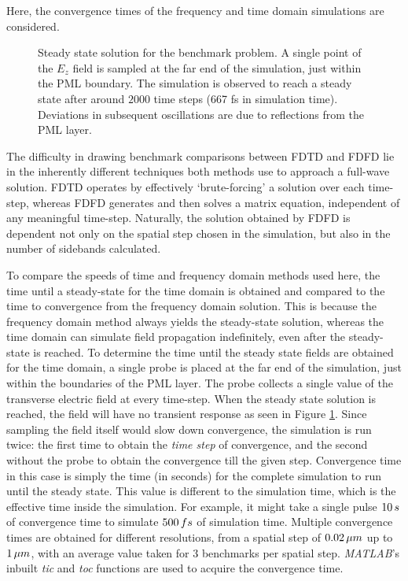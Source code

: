 Here, the convergence times of the frequency and time domain simulations are considered. 
\begin{figure}[t]
	\centering
	\setlength{\figH}{0.3\textwidth}
	\setlength{\figW}{0.7\textwidth}
	
	\caption[Steady state time of the $E_z$ field]{Steady state solution for the benchmark problem. A single point of the $E_z$ field is sampled at the far end of the simulation, just within the PML boundary. The simulation is observed to reach a steady state after around $2 000$ time steps (667 fs in simulation time). Deviations in subsequent oscillations are due to reflections from the PML layer.}
	\label{fig:steadystate}
\end{figure}
The difficulty in drawing benchmark comparisons between FDTD and FDFD lie in the inherently different techniques both methods use to approach a full-wave solution. FDTD operates by effectively `brute-forcing' a solution over each time-step, whereas FDFD generates and then solves a matrix equation, independent of any meaningful time-step. Naturally, the solution obtained by FDFD is dependent not only on the spatial step chosen in the simulation, but also in the number of sidebands calculated. 

To compare the speeds of time and frequency domain methods used here, the time until a steady-state for the time domain is obtained and compared to the time to convergence from the frequency domain solution. This is because the frequency domain method always yields the steady-state solution, whereas the time domain can simulate field propagation indefinitely, even after the steady-state is reached. To determine the time until the steady state fields are obtained for the time domain, a single probe is placed at the far end of the simulation, just within the boundaries of the PML layer. The probe collects a single value of the transverse electric field at every time-step. When the steady state solution is reached, the field will have no transient response as seen in Figure \ref{fig:steadystate}. Since sampling the field itself would slow down  convergence, the simulation is run twice: the first time to obtain the \textit{time step} of convergence, and the second without the probe to obtain the convergence till the given step. Convergence time in this case is simply the time (in seconds) for the complete simulation to run until the steady state. This value is different to the simulation time, which is the effective time inside the simulation. For example, it might take a single pulse $10 \mskip3mu s$ of convergence time to simulate $500\mskip3mu fs$ of simulation time. Multiple convergence times are obtained for different resolutions, from a spatial step of $0.02 \mskip3mu \mu m$ up to $1  \mskip3mu \mu m$, with an average value taken for $3$ benchmarks per spatial step. \textit{MATLAB}'s inbuilt \textit{tic} and \textit{toc} functions are used to acquire the convergence time.

